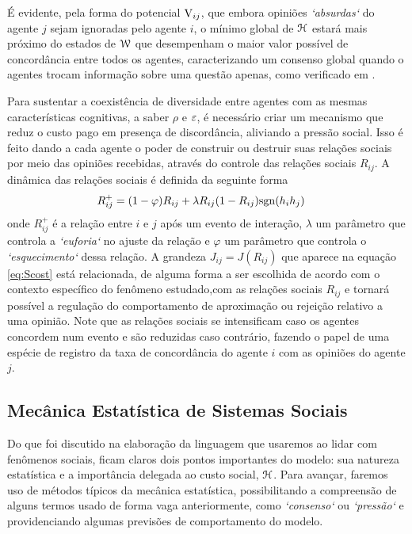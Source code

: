 É evidente, pela forma do potencial ${\mathrm{V}}_{ij}$, que embora opiniões \emph{`absurdas`} do agente $j$ sejam ignoradas pelo agente $i$, o mínimo global de ${\mathcal{H}}$ estará mais próximo do estados de $\mathcal{W}$ que desempenham o maior valor possível de concordância entre todos os agentes, caracterizando um consenso global quando o agentes trocam informação sobre uma questão apenas, como verificado em  \parencite{Caticha2011}.

Para sustentar a coexistência de diversidade entre agentes com as mesmas características cognitivas, a saber $\rho$ e $\varepsilon$, é necessário criar um mecanismo que reduz o custo pago em presença de discordância, aliviando a pressão social.
Isso é feito dando a cada agente o poder de construir ou destruir suas relações sociais por meio das opiniões recebidas, através do controle das relações sociais $R_{ij}$.
A dinâmica das relações sociais é definida da seguinte forma
\begin{align}
  R_{ij}^{+} & = (1-\varphi)R_{ij} + \lambda R_{ij}(1 - R_{ij})\sgn(h_ih_j) \label{eq:Rt}
\end{align}
onde $R_{ij}^{+}$ é a relação entre $i$ e $j$ após um evento de interação, $\lambda$ um parâmetro que controla a \emph{`euforia`} no ajuste da relação e $\varphi$ um parâmetro que controla o \emph{`esquecimento`} dessa relação. A grandeza $J_{ij}=J(R_{ij})$ que aparece na equação \eqref{eq:Scost} está relacionada, de alguma forma a ser escolhida de acordo com o contexto específico do fenômeno estudado,com as relações sociais $R_{ij}$ e tornará possível a regulação do comportamento de aproximação ou rejeição relativo a uma opinião.
Note que as relações sociais se intensificam caso os agentes concordem num evento e são reduzidas caso contrário, fazendo o papel de uma espécie de registro da taxa de concordância do agente $i$ com as opiniões do agente $j$.

\subsection{Mecânica Estatística de Sistemas Sociais}\label{ssec:AMSM2}

Do que foi discutido na elaboração da linguagem que usaremos ao lidar com fenômenos sociais, ficam claros dois pontos importantes do modelo: sua natureza estatística e a importância delegada ao custo social, ${\mathcal{H}}$.
Para avançar, faremos uso de métodos típicos da mecânica estatística, possibilitando a compreensão de alguns termos usado de forma vaga anteriormente, como \emph{`consenso`} ou \emph{`pressão`} e providenciando algumas previsões de comportamento do modelo.

